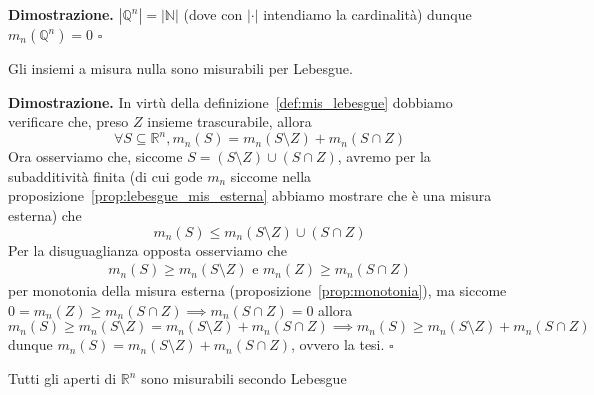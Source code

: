 %
\noindent \textbf{Dimostrazione. }
$|\mathbb{Q}^n| = |\mathbb{N}|$ (dove con $|\cdot|$ intendiamo la cardinalità) dunque $m_n(\mathbb{Q}^n) = 0$
\hfill $\square$
%
\vspace{0.5cm}
\begin{cor}
	Gli insiemi a misura nulla sono misurabili per Lebesgue.
	\label{cor:mis_nulla_misur}
\end{cor}
%
\noindent \textbf{Dimostrazione. }
In virtù della definizione~\ref{def:mis_lebesgue} dobbiamo verificare che, preso $Z$ insieme trascurabile, allora
$$
\forall S \subseteq \mathbb{R}^n, m_n(S) = m_n(S \setminus Z) + m_n(S \cap Z)
$$
Ora osserviamo che, siccome $S = (S \setminus Z) \cup (S \cap Z)$, avremo per la subadditività finita (di cui gode $m_n$ siccome nella proposizione~\ref{prop:lebesgue_mis_esterna} abbiamo mostrare che è una misura esterna)
che
$$
m_n(S) \leq m_n(S \setminus Z) \cup (S \cap Z)
$$
Per la disuguaglianza opposta osserviamo che
\[\begin{aligned}
m_n(S) \geq m_n(S \setminus Z) \text{ e } m_n(Z) \geq m_n(S \cap Z)
\end{aligned}\]
per monotonia della misura esterna (proposizione~\ref{prop:monotonia}), ma siccome $0=m_n(Z) \geq m_n(S \cap Z) \implies m_n(S \cap Z) = 0$ allora
$$
m_n(S) \geq m_n(S \setminus Z) = m_n(S \setminus Z) + m_n(S \cap Z) \implies m_n(S) \geq m_n(S \setminus Z) + m_n(S \cap Z)
$$
dunque $m_n(S) = m_n(S \setminus Z) + m_n(S \cap Z)$, ovvero la tesi.
\hfill $\square$
%
\vspace{0.5cm}
\begin{theorem}[\textcolor{blue}{gli aperti sono misurabili}]
	Tutti gli aperti di $\mathbb{R}^n$ sono misurabili secondo Lebesgue
\end{theorem}

